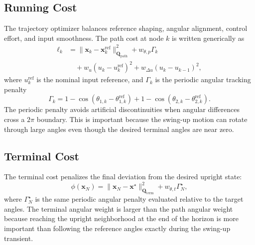 \documentclass[conference]{IEEEtran}
\begin{document}
\subsection{Running Cost}
The trajectory optimizer balances reference shaping, angular alignment, control effort, and input smoothness. The path cost at node $k$ is written generically as
\begin{align}
\ell_k
&=
\|\bm{x}_k-\bm{x}_k^{\mathrm{ref}}\|_{\bm{Q}_{\mathrm{path}}}^{2}
+
w_{\theta,p}\Gamma_k
\nonumber\\
&\quad+
w_u(u_k-u_k^{\mathrm{ref}})^2
+
w_{\Delta u}(u_k-u_{k-1})^2 ,
\label{eq:pathcost}
\end{align}
where $u_k^{\mathrm{ref}}$ is the nominal input reference, and $\Gamma_k$ is the periodic angular tracking penalty
\begin{equation}
\Gamma_k
=
1-\cos(\theta_{1,k}-\theta_{1,k}^{\mathrm{ref}})
+
1-\cos(\theta_{2,k}-\theta_{2,k}^{\mathrm{ref}}).
\end{equation}
The periodic penalty avoids artificial discontinuities when angular differences cross a $2\pi$ boundary. This is important because the swing-up motion can rotate through large angles even though the desired terminal angles are near zero.

\subsection{Terminal Cost}
The terminal cost penalizes the final deviation from the desired upright state:
\begin{equation}
\phi(\bm{x}_N)
=
\|\bm{x}_N-\bm{x}^{\star}\|_{\bm{Q}_{\mathrm{term}}}^{2}
+
w_{\theta,t}\Gamma_N^{\star},
\label{eq:terminal}
\end{equation}
where $\Gamma_N^{\star}$ is the same periodic angular penalty evaluated relative to the target angles. The terminal angular weight is larger than the path angular weight because reaching the upright neighborhood at the end of the horizon is more important than following the reference angles exactly during the swing-up transient.
\end{document}
